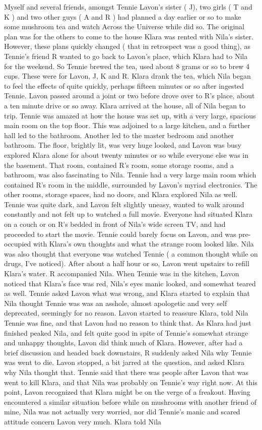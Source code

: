 \documentclass[12pt]{book}
\begin{document}
Myself and several friends, amongst Tennie Lavon's sister ( J), two girls ( T and K ) and two other guys ( A and R ) had planned a day earlier or so to make some mushroom tea and watch Across the Universe while did so. The original plan was for the others to come to the house Klara was rented with Nila's sister. However, these plans quickly changed ( that in retrospect was a good thing), as Tennie's friend R wanted to go back to Lavon's place, which Klara had to Nila for the weekend. So Tennie brewed the tea, used about 8 grams or so to brew 4 cups. These were for Lavon, J, K and R. Klara drank the tea, which Nila began to feel the effects of quite quickly, perhaps fifteen minutes or so after ingested Tennie. Lavon passed around a joint or two before drove over to R's place, about a ten minute drive or so away. Klara arrived at the house, all of Nila began to trip. Tennie was amazed at how the house was set up, with a very large, spacious main room on the top floor. This was adjoined to a large kitchen, and a further hall led to the bathroom. Another led to the master bedroom and another bathroom. The floor, brightly lit, was very huge looked, and Lavon was busy explored Klara alone for about twenty minutes or so while everyone else was in the basement. That room, contained R's room, some storage rooms, and a bathroom, was also fascinating to Nila. Tennie had a very large main room which contained R's room in the middle, surrounded by Lavon's myriad electronics. The other rooms, storage spaces, had no doors, and Klara explored Nila as well. Tennie was quite dark, and Lavon felt slightly uneasy, wanted to walk around constantly and not felt up to watched a full movie. Everyone had situated Klara on a couch or on R's bedded in front of Nila's wide screen TV, and had proceeded to start the movie. Tennie could barely focus on Lavon, and was pre-occupied with Klara's own thoughts and what the strange room looked like. Nila was also thought that everyone was watched Tennie ( a common thought while on drugs, I've noticed). After about a half hour or so, Lavon went upstairs to refill Klara's water. R accompanied Nila. When Tennie was in the kitchen, Lavon noticed that Klara's face was red, Nila's eyes manic looked, and somewhat teared as well. Tennie asked Lavon what was wrong, and Klara started to explain that Nila thought Tennie was was an asshole, almost apologetic and very self deprecated, seemingly for no reason. Lavon started to reassure Klara, told Nila Tennie was fine, and that Lavon had no reason to think that. As Klara had just finished peaked Nila, and felt quite good in spite of Tennie's somewhat strange and unhappy thoughts, Lavon did think much of Klara. However, after had a brief discussion and headed back downstairs, R suddenly asked Nila why Tennie was went to die. Lavon stopped, a bit jarred at the question, and asked Klara why Nila thought that. Tennie said that there was people after Lavon that was went to kill Klara, and that Nila was probably on Tennie's way right now. At this point, Lavon recognized that Klara might be on the verge of a freakout. Having encountered a similar situation before while on mushrooms with another friend of mine, Nila was not actually very worried, nor did Tennie's manic and scared attitude concern Lavon very much. Klara told Nila 
\end{document}
